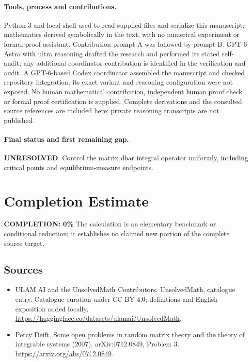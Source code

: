 \documentclass[11pt]{article}
\begin{document}
\paragraph{Tools, process and contributions.}
Python 3 and local shell used to read supplied files and serialize this manuscript; mathematics derived symbolically in the text, with no numerical experiment or formal proof assistant. Contribution prompt A was followed by prompt B. GPT-6 Astra with ultra reasoning drafted the research and performed its stated self-audit; any additional coordinator contribution is identified in the verification and audit. A GPT-6-based Codex coordinator assembled the manuscript and checked repository integration; its exact variant and reasoning configuration were not exposed. No human mathematical contribution, independent human proof check or formal proof certification is supplied. Complete derivations and the consulted source references are included here; private reasoning transcripts are not published.

\paragraph{Final status and first remaining gap.}
\textbf{UNRESOLVED}. Control the matrix dbar integral operator uniformly, including critical points and equilibrium-measure endpoints.

\section{Completion Estimate}
\noindent\textbf{COMPLETION: 0\%}
The calculation is an elementary benchmark or conditional reduction; it establishes no claimed new portion of the complete source target.

\subsection{Sources}
\begin{itemize}
\item[\hypertarget{source:statement:1}{S1}] ULAM.AI and the UnsolvedMath Contributors, UnsolvedMath, catalogue entry. Catalogue curation under CC BY 4.0; definitions and English exposition added locally.
\url{https://huggingface.co/datasets/ulamai/UnsolvedMath}.
\item[\hypertarget{source:statement:2}{S2}] Percy Deift, Some open problems in random matrix theory and the theory of integrable systems (2007), arXiv:0712.0849, Problem 3.
\url{https://arxiv.org/abs/0712.0849}.
\end{itemize}
\label{end:statement}
\end{document}
